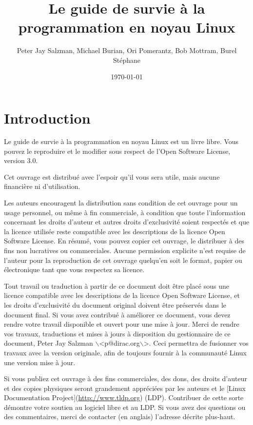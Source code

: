\documentclass[11pt]{article}
\author{Peter Jay Salzman, Michael Burian, Ori Pomerantz, Bob Mottram, Burel Stéphane}
\date{\today}
\title{Le guide de survie à la programmation en noyau Linux}
\begin{document}
\maketitle
\tableofcontents


\section*{Introduction}
\label{sec-1}

Le guide de survie à la programmation en noyau Linux est un livre libre. Vous pouvez le reproduire et le modifier sous respect de l'Open Software License, version 3.0.

Cet ouvrage est distribué avec l'espoir qu'il vous sera utile, mais aucune financière ni d'utilisation.

Les auteurs encouragent la distribution sans condition de cet ouvrage pour un usage personnel, ou même à fin commerciale, à condition que toute l'information concernant les droits d'auteur et autres droits d'exclusivité soient respectés et que la licence utilisée reste compatible avec les descriptions de la licence Open Software License. En résumé, vous pouvez copier cet ouvrage, le distribuer à des fins non lucratives ou commerciales. Aucune permission explicite n'est requise de l'auteur pour la reproduction de cet ouvrage quelqu'en soit le format, papier ou électronique tant que vous respectez sa licence.

Tout travail ou traduction à partir de ce document doit être placé sous une licence compatible avec les descriptions de la licence Open Software License, et les droits d'exclusivité du document original doivent être préservés dans le document final. Si vous avez contribué à améliorer ce document, vous devez rendre votre travail disponible et ouvert pour une mise à jour. Merci de rendre vos travaux, traductions et mises à jours à disposition du gestionnaire de ce document, Peter Jay Salzman $\backslash$<p@dirac.org$\backslash$>. Ceci permettra de fusionner vos travaux avec la version originale, afin de toujours fournir à la communauté Linux une version mise à jour.

Si vous publiez cet ouvrage à des fins commerciales, des dons, des droits d'auteur et des copies physiques seront grandement appréciées par les auteurs et le [Linux Documentation Project](\url{http://www.tldp.org}) (LDP). Contribuer de cette sorte démontre votre soutien au logiciel libre et au LDP. Si vous avez des questions ou des commentaires, merci de contacter (en anglais) l'adresse décrite plus-haut.
\end{document}
